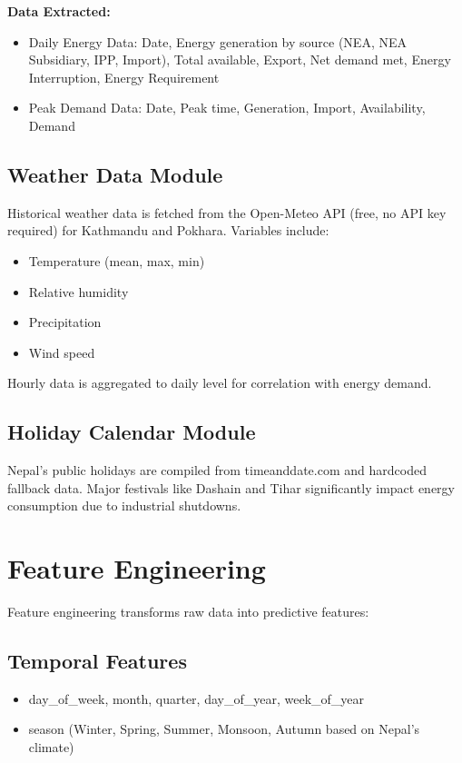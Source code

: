     \textbf{Data Extracted:}
    \begin{itemize}
        \item Daily Energy Data: Date, Energy generation by source (NEA, NEA Subsidiary, IPP, Import), Total available, Export, Net demand met, Energy Interruption, Energy Requirement
        \item Peak Demand Data: Date, Peak time, Generation, Import, Availability, Demand
    \end{itemize}

    \subsection{Weather Data Module}
    Historical weather data is fetched from the Open-Meteo API (free, no API key required) for Kathmandu and Pokhara. Variables include:
    \begin{itemize}
        \item Temperature (mean, max, min)
        \item Relative humidity
        \item Precipitation
        \item Wind speed
    \end{itemize}
    Hourly data is aggregated to daily level for correlation with energy demand.

    \subsection{Holiday Calendar Module}
    Nepal's public holidays are compiled from timeanddate.com and hardcoded fallback data. Major festivals like Dashain and Tihar significantly impact energy consumption due to industrial shutdowns.

    \section{Feature Engineering}
    Feature engineering transforms raw data into predictive features:

    \subsection{Temporal Features}
    \begin{itemize}
        \item day\_of\_week, month, quarter, day\_of\_year, week\_of\_year
        \item season (Winter, Spring, Summer, Monsoon, Autumn based on Nepal's climate)
    \end{itemize}

